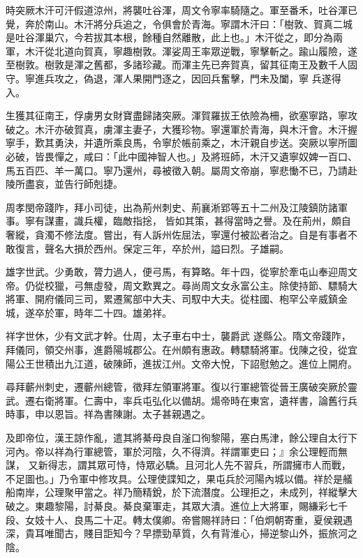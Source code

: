\begin{pinyinscope}
 時突厥木汗可汗假道涼州，將襲吐谷渾，周文令寧率騎隨之。軍至番禾，吐谷渾已覺，奔於南山。木汗將分兵追之，令俱會於青海。寧謂木汗曰：「樹敦、賀真二城是吐谷渾巢穴，今若拔其本根，餘種自然離散，此上也。」木汗從之，即分為兩軍，木汗從北道向賀真，寧趣樹敦。渾娑周王率眾逆戰，寧擊斬之。踰山履險，遂至樹敦。樹敦是渾之舊都，多諸珍藏。而渾主先已奔賀真，留其征南王及數千人固守。寧進兵攻之，偽退，渾人果開門逐之，因回兵奮擊，門未及闔，寧
 兵遂得入。



 生獲其征南王，俘虜男女財寶盡歸諸突厥。渾賀羅拔王依險為柵，欲塞寧路，寧攻破之。木汗亦破賀真，虜渾主妻子，大獲珍物。寧還軍於青海，與木汗會。木汗握寧手，歎其勇決，并遺所乘良馬，令寧於帳前乘之，木汗親自步送。突厥以寧所圖必破，皆畏憚之，咸曰：「此中國神智人也。」及將班師，木汗又遺寧奴婢一百口、馬五百匹、羊一萬口。寧乃還州，尋被徵入朝。屬周文帝崩，寧悲慟不已，乃請赴陵所盡哀，並告行師剋捷。



 周孝閔帝踐阼，拜小司徒，出為荊州刺史、荊襄淅郢等五十二州及江陵鎮防諸軍事。寧有謀畫，識兵權，臨敵指捴，
 皆如其策，甚得當時之譽。及在荊州，頗自奢縱，貪濁不修法度。嘗出，有人訴州佐屈法，寧還付被訟者治之。自是有事者不敢復言，聲名大損於西州。保定三年，卒於州，謚曰烈。子雄嗣。



 雄字世武。少勇敢，膂力過人，便弓馬，有算略。年十四，從寧於牽屯山奉迎周文帝。仍從校獵，弓無虛發，周文歎異之。尋尚周文女永富公主。除使持節、驃騎大將軍、開府儀同三司，累遷駕部中大夫、司馭中大夫。從柱國、枹罕公辛威鎮金城，遂卒於軍，時年二十四。雄弟祥。



 祥字世休，少有文武才幹。仕周，太子車右中士，襲爵武
 遂縣公。隋文帝踐阼，拜儀同，領交州事，進爵陽城郡公。在州頗有惠政。轉驃騎將軍。伐陳之役，從宜陽公王世積出九江道，破陳師，進拔江州。文帝大悅，下詔慰勉之。進位上開府。



 尋拜蘄州刺史，遷蘄州總管，徵拜左領軍將軍。復以行軍總管從晉王廣破突厥於靈武。遷右衛將軍。仁壽中，率兵屯弘化以備胡。煬帝時在東宮，遺祥書，論舊行兵時事，申以恩旨。祥為書陳謝。太子甚親遇之。



 及即帝位，漢王諒作亂，遣其將綦母良自滏口徇黎陽，塞白馬津，餘公理自太行下河內。帝以祥為行軍總管，軍於河陰，久不得濟。祥謂軍吏曰；』余公理輕而無謀，
 又新得志，謂其眾可恃，恃眾必驕。且河北人先不習兵，所謂擁市人而戰，不足圖也。」乃令軍中修攻具。公理使諜知之，果屯兵於河陽內城以備。祥於是艤船南岸，公理聚甲當之。祥乃簡精銳，於下流潛度。公理拒之，未成列，祥縱擊大破之。東趣黎陽，討綦良。綦良棄軍走，其眾大潰。進位上大將軍，賜縑彩七千段、女妓十人、良馬二十疋。轉太僕卿。帝嘗賜祥詩曰：「伯炯朝寄重，夏侯親遇深，貴耳唯聞古，賤目詎知今？早摽勁草質，久有背淮心，掃逆黎山外，振旅河之陰。




\end{pinyinscope}
